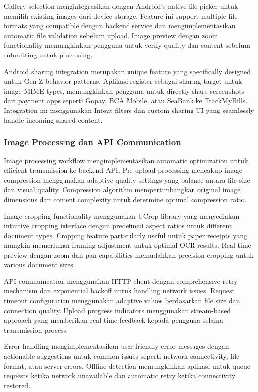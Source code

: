 Gallery selection mengintegrasikan dengan Android's native file picker untuk memilih existing images dari device storage. Feature ini support multiple file formats yang compatible dengan backend service dan mengimplementasikan automatic file validation sebelum upload. Image preview dengan zoom functionality memungkinkan pengguna untuk verify quality dan content sebelum submitting untuk processing.

Android sharing integration merupakan unique feature yang specifically designed untuk Gen Z behavior patterns. Aplikasi register sebagai sharing target untuk image MIME types, memungkinkan pengguna untuk directly share screenshots dari payment apps seperti Gopay, BCA Mobile, atau SeaBank ke TrackMyBills. Integration ini menggunakan Intent filters dan custom sharing UI yang seamlessly handle incoming shared content.

\subsubsection{Image Processing dan API Communication}
\label{subsubsec:image-processing-api}

Image processing workflow mengimplementasikan automatic optimization untuk efficient transmission ke backend API. Pre-upload processing mencakup image compression menggunakan adaptive quality settings yang balance antara file size dan visual quality. Compression algorithm mempertimbangkan original image dimensions dan content complexity untuk determine optimal compression ratio.

Image cropping functionality menggunakan UCrop library yang menyediakan intuitive cropping interface dengan predefined aspect ratios untuk different document types. Cropping feature particularly useful untuk paper receipts yang mungkin memerlukan framing adjustment untuk optimal OCR results. Real-time preview dengan zoom dan pan capabilities memudahkan precision cropping untuk various document sizes.

API communication menggunakan HTTP client dengan comprehensive retry mechanism dan exponential backoff untuk handling network issues. Request timeout configuration menggunakan adaptive values berdasarkan file size dan connection quality. Upload progress indicators menggunakan stream-based approach yang memberikan real-time feedback kepada pengguna selama transmission process.

Error handling mengimplementasikan user-friendly error messages dengan actionable suggestions untuk common issues seperti network connectivity, file format, atau server errors. Offline detection memungkinkan aplikasi untuk queue requests ketika network unavailable dan automatic retry ketika connectivity restored.

